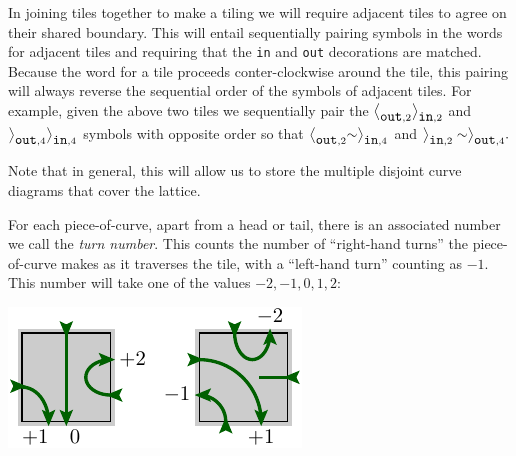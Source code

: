 \documentclass[aps, letterpaper, onecolumn, superscriptaddress, notitlepage, 10pt]{revtex4-1}
\begin{document}
In joining tiles together to make a tiling we will
require adjacent tiles to agree on their shared boundary.
This will entail sequentially pairing symbols in the
words for adjacent tiles
and requiring that 
the {\tt in} and {\tt out} decorations are matched.
Because the word for a tile proceeds conter-clockwise
around the tile, this pairing will always reverse the
sequential order of the symbols of adjacent tiles.
For example, given the above two tiles we sequentially pair the 
$\bigl<_{\mbox{\tt out},2}\bigr>_{\mbox{\tt in},2}$ 
and $\bigr>_{\mbox{\tt out},4}\bigr>_{\mbox{\tt in},4}$
symbols with opposite order so that
$\bigl<_{\mbox{\tt out},2}\sim\bigr>_{\mbox{\tt in},4}$
and $\bigr>_{\mbox{\tt in},2} \sim \bigr>_{\mbox{\tt out},4}.$ 


Note that in general, this will allow us to store the multiple disjoint curve diagrams that cover the lattice.


For each piece-of-curve, apart from a head or tail, there is an associated 
number we call the \emph{turn number}. This counts the number
of ``right-hand turns'' the piece-of-curve makes as it
traverses the tile, with a ``left-hand turn'' counting as $-1.$
This number will take one of the values $-2, -1, 0, 1, 2:$
\begin{center}
\includegraphics[]{pic-cells-3.pdf}
\end{center}
\end{document}
